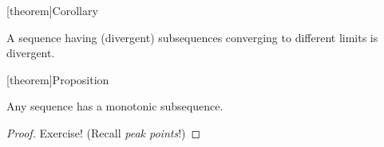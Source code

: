 \documentclass[12pt]{report}
\theoremstyle{definition}
\begin{document}
[theorem]{Corollary}
\begin{divergent subsequence}
    A sequence having (divergent) subsequences converging to different limits is divergent.
\end{divergent subsequence}

[theorem]{Proposition}
\begin{monotonic subsequence}
    Any sequence has a monotonic subsequence.
\end{monotonic subsequence}

\begin{proof}
    Exercise! (Recall \emph{peak points}!)
\end{proof}
\end{document}
